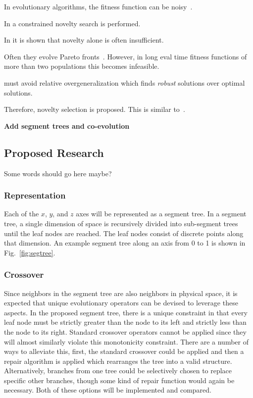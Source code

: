 \documentclass{article}
\begin{document}
In evolutionary algorithms, the fitness function can be noisy~\cite{ref:Jin2005}.

In \cite{ref:Liapis2015} a constrained novelty search is performed.

In \cite{ref:smith2015} it is shown that novelty alone is often insufficient.

Often they evolve Pareto fronts~\cite{ref:Bucci2005}. However, in long eval time fitness functions of more than two populations this becomes infeasible.

must avoid relative overgeneralization which finds \textit{robust} solutions over optimal solutions.

Therefore, novelty selection is proposed. This is similar to~\cite{ref:Lehman2011}.

\textbf{Add segment trees and co-evolution}

\subsection{Proposed Research}\label{sec:b3}
Some words should go here maybe?

\subsubsection{Representation}
Each of the $x$, $y$, and $z$ axes will be represented as a segment tree. In a segment tree, a single dimension of space is recursively divided into sub-segment trees until the leaf nodes are reached. The leaf nodes consist of discrete points along that dimension. An example segment tree along an axis from 0 to 1 is shown in Fig.~\ref{fig:segtree}.

\subsubsection{Crossover}
Since neighbors in the segment tree are also neighbors in physical space, it is expected that unique evolutionary operators can be devised to leverage these aspects. In the proposed segment tree, there is a unique constraint in that every leaf node must be strictly greater than the node to its left and strictly less than the node to its right. Standard crossover operators cannot be applied since they will almost similarly violate this monotonicity constraint. There are a number of ways to alleviate this, first, the standard crossover could be applied and then a repair algorithm is applied which rearranges the tree into a valid structure. Alternatively, branches from one tree could be selectively chosen to replace specific other branches, though some kind of repair function would again be necessary. Both of these options will be implemented and compared.
\end{document}
